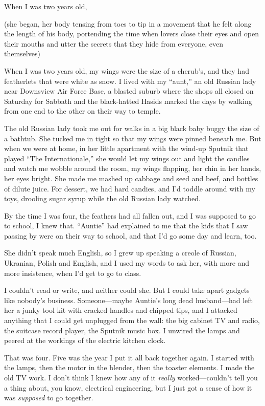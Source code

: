 When I was two years old,

(she began, her body tensing from toes to tip in a movement that he
felt along the length of his body, portending the time when lovers
close their eyes and open their mouths and utter the secrets that they
hide from everyone, even themselves)

When I was two years old, my wings were the size of a cherub's, and
they had featherlets that were white as snow.  I lived with my
``aunt,'' an old Russian lady near Downsview Air Force Base, a blasted
suburb where the shops all closed on Saturday for Sabbath and the
black-hatted Hasids marked the days by walking from one end to the
other on their way to temple.

The old Russian lady took me out for walks in a big black baby buggy
the size of a bathtub.  She tucked me in tight so that my wings were
pinned beneath me.  But when we were at home, in her little apartment
with the wind-up Sputnik that played ``The Internationale,'' she would
let my wings out and light the candles and watch me wobble around the
room, my wings flapping, her chin in her hands, her eyes bright.  She
made me mashed up cabbage and seed and beef, and bottles of dilute
juice.  For dessert, we had hard candies, and I'd toddle around with
my toys, drooling sugar syrup while the old Russian lady watched.

By the time I was four, the feathers had all fallen out, and I was
supposed to go to school, I knew that.  ``Auntie'' had explained to me
that the kids that I saw passing by were on their way to school, and
that I'd go some day and learn, too.

She didn't speak much English, so I grew up speaking a creole of
Russian, Ukranian, Polish and English, and I used my words to ask her,
with more and more insistence, when I'd get to go to class.

I couldn't read or write, and neither could she.  But I could take
apart gadgets like nobody's business.  Someone---maybe Auntie's long
dead husband---had left her a junky tool kit with cracked handles and
chipped tips, and I attacked anything that I could get unplugged from
the wall:  the big cabinet TV and radio, the suitcase record player,
the Sputnik music box.  I unwired the lamps and peered at the workings
of the electric kitchen clock.

That was four.  Five was the year I put it all back together again.  I
started with the lamps, then the motor in the blender, then the
toaster elements.  I made the old TV work.  I don't think I knew how
any of it \textit{really} worked---couldn't tell you a thing about,
you know, electrical engineering, but I just got a sense of how it was
\textit{supposed} to go together.

